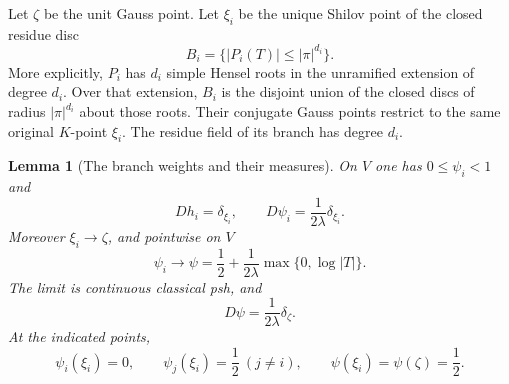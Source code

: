 \documentclass[11pt,a4paper]{article}
\numberwithin{equation}{section}
\newtheorem{lemma}[theorem]{Lemma}
\theoremstyle{definition}
\theoremstyle{remark}
\begin{document}
Let $\zeta$ be the unit Gauss point. Let $\xi_i$ be the unique
Shilov point of the closed residue disc
\[
 B_i=\{|P_i(T)|\leq|\pi|^{d_i}\}.
\]
More explicitly, $P_i$ has $d_i$ simple Hensel roots in the
unramified extension of degree $d_i$. Over that extension,
$B_i$ is the disjoint union of the closed discs of radius
$|\pi|^{d_i}$ about those roots. Their conjugate Gauss points
restrict to the same original $K$-point $\xi_i$.
The residue field of its branch has degree $d_i$.

\begin{lemma}[The branch weights and their measures]
\label{lem:r2-moving-branch-measures}
On $V$ one has $0\leq\psi_i<1$ and
\[
 D h_i=\delta_{\xi_i},\qquad
 D\psi_i=\frac1{2\lambda}\delta_{\xi_i}.
\]
Moreover $\xi_i\to\zeta$, and pointwise on $V$
\[
 \psi_i\longrightarrow
 \psi=\frac12+\frac1{2\lambda}\max\{0,\log|T|\}.
\]
The limit is continuous classical psh, and
\[
 D\psi=\frac1{2\lambda}\delta_\zeta.
\]
At the indicated points,
\[
 \psi_i(\xi_i)=0,\qquad
 \psi_j(\xi_i)=\frac12\ (j\ne i),\qquad
 \psi(\xi_i)=\psi(\zeta)=\frac12.
\]
\end{lemma}
\end{document}
